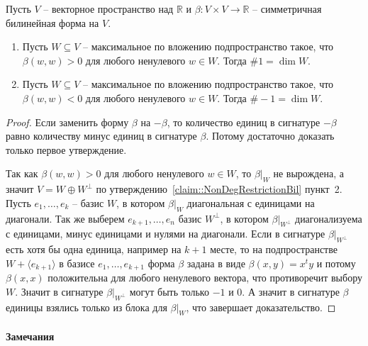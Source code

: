 \begin{claim}
Пусть $V$ -- векторное пространство над $\mathbb R$ и $\beta\colon V\times V\to \mathbb R$ -- симметричная билинейная форма на $V$.
\begin{enumerate}
\item Пусть $W\subseteq V$ -- максимальное по вложению подпространство такое, что $\beta(w, w) > 0$ для любого ненулевого $w\in W$.
Тогда $\#1 = \dim W$.

\item Пусть $W\subseteq V$ -- максимальное по вложению подпространство такое, что $\beta(w, w) < 0$ для любого ненулевого $w\in W$.
Тогда $\#-1 = \dim W$.
\end{enumerate}
\end{claim}
\begin{proof}
Если заменить форму $\beta$ на $-\beta$, то количество единиц в сигнатуре $-\beta$ равно количеству минус единиц в сигнатуре $\beta$.
Потому достаточно доказать только первое утверждение.


Так как $\beta(w, w) > 0$ для любого ненулевого $w\in W$, то $\beta|_W$ не вырождена, а значит $V = W\oplus W^\bot$  по утверждению~\ref{claim::NonDegRestrictionBil} пункт~2.
Пусть $e_1,\ldots,e_k$ -- базис $W$, в котором $\beta|_W$ диагональная с единицами на диагонали.
Так же выберем $e_{k+1},\ldots,e_n$ базис $W^\bot$, в котором $\beta|_{W^\bot}$ диагонализуема с единицами, минус единицами и нулями на диагонали.
Если в сигнатуре $\beta|_{W^\bot}$ есть хотя бы одна единица, например на $k+1$ месте, то на подпространстве $W+\langle e_{k+1}\rangle$ в базисе $e_1,\ldots,e_{k+1}$ форма $\beta$ задана в виде $\beta(x, y) = x^t y$ и потому $\beta(x,x)$ положительна для любого ненулевого вектора, что противоречит выбору $W$.
Значит в сигнатуре $\beta|_{W^\bot}$ могут быть только $-1$ и $0$.
А значит в сигнатуре $\beta$ единицы взялись только из блока для $\beta|_W$, что завершает доказательство.
\end{proof}

\paragraph{Замечания}

